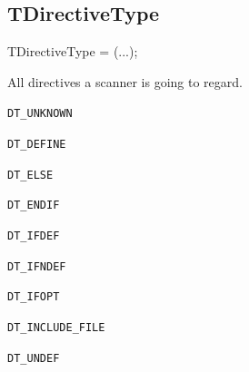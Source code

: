 \documentclass{report}
\newif\ifpdf
\begin{document}
\subsection*{TDirectiveType}
\fi
\label{PasDoc_Scanner-TDirectiveType}
\begin{list}{}{
\setlength{\itemindent}{0cm}
\setlength{\listparindent}{0cm}
\setlength{\leftmargin}{\evensidemargin}
\addtolength{\leftmargin}{\tmplength}
\settowidth{\labelsep}{X}
\addtolength{\leftmargin}{\labelsep}
\setlength{\labelwidth}{\tmplength}
}
\item[\textbf{Declaration}\hfill]
\ifpdf
\begin{flushleft}
\fi
\begin{ttfamily}
TDirectiveType = (...);\end{ttfamily}

\ifpdf
\end{flushleft}
\fi

\par
\item[\textbf{Description}]
All directives a scanner is going to regard.\item[\textbf{Values}]
\begin{description}
\item[\texttt{DT{\_}UNKNOWN}] \label{PasDoc_Scanner-DT_UNKNOWN}
\index{}
 
\item[\texttt{DT{\_}DEFINE}] \label{PasDoc_Scanner-DT_DEFINE}
\index{}
 
\item[\texttt{DT{\_}ELSE}] \label{PasDoc_Scanner-DT_ELSE}
\index{}
 
\item[\texttt{DT{\_}ENDIF}] \label{PasDoc_Scanner-DT_ENDIF}
\index{}
 
\item[\texttt{DT{\_}IFDEF}] \label{PasDoc_Scanner-DT_IFDEF}
\index{}
 
\item[\texttt{DT{\_}IFNDEF}] \label{PasDoc_Scanner-DT_IFNDEF}
\index{}
 
\item[\texttt{DT{\_}IFOPT}] \label{PasDoc_Scanner-DT_IFOPT}
\index{}
 
\item[\texttt{DT{\_}INCLUDE{\_}FILE}] \label{PasDoc_Scanner-DT_INCLUDE_FILE}
\index{}
 
\item[\texttt{DT{\_}UNDEF}] \label{PasDoc_Scanner-DT_UNDEF}
\index{}
 

\end{description}
\end{list}
\end{document}
